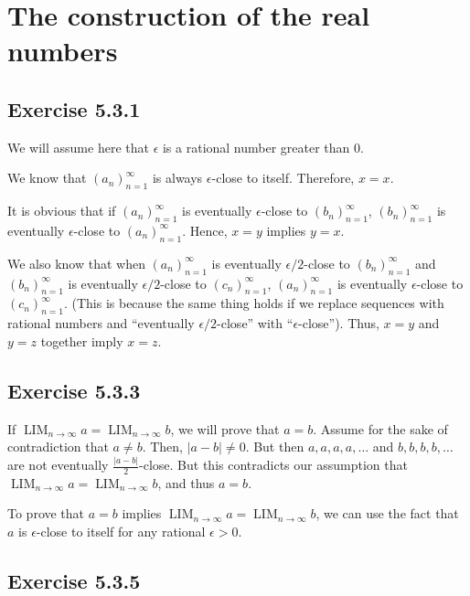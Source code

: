 \documentclass[12pt, oneside]{book}
\DeclareMathOperator*{\formallim}{LIM}
\begin{document}
	\section{The construction of the real numbers}
	
	\subsection*{Exercise 5.3.1}
	
	We will assume here that $\epsilon$ is a rational number greater than $0$.
	
	We know that $(a_n)_{n = 1}^\infty$ is always $\epsilon$-close to itself. Therefore, $x = x$.
	
	It is obvious that if $(a_n)_{n = 1}^\infty$ is eventually $\epsilon$-close to $(b_n)_{n = 1}^\infty$, $(b_n)_{n = 1}^\infty$ is eventually $\epsilon$-close to $(a_n)_{n = 1}^\infty$. Hence, $x = y$ implies $y = x$.
	
	We also know that when $(a_n)_{n = 1}^\infty$ is eventually $\epsilon/2$-close to $(b_n)_{n = 1}^\infty$ and $(b_n)_{n = 1}^\infty$ is eventually $\epsilon/2$-close to $(c_n)_{n = 1}^\infty$, $(a_n)_{n = 1}^\infty$ is eventually $\epsilon$-close to $(c_n)_{n = 1}^\infty$. (This is because the same thing holds if we replace sequences with rational numbers and ``eventually $\epsilon/2$-close'' with ``$\epsilon$-close''). Thus, $x = y$ and $y = z$ together imply $x = z$.
	
	\subsection*{Exercise 5.3.3}
	
	If $\formallim_{n \to \infty} a = \formallim_{n \to \infty} b$, we will prove that $a = b$. Assume for the sake of contradiction that $a \ne b$. Then, $|a - b| \ne 0$. But then $a, a, a, a, \dotsc$ and $b, b, b, b, \dotsc$ are not eventually $\frac{|a - b|}{2}$-close. But this contradicts our assumption that $\formallim_{n \to \infty} a = \formallim_{n \to \infty} b$, and thus $a = b$.
	
	To prove that $a = b$ implies $\formallim_{n \to \infty} a = \formallim_{n \to \infty} b$, we can use the fact that $a$ is $\epsilon$-close to itself for any rational $\epsilon > 0$.
	
	\subsection*{Exercise 5.3.5}
	
\end{document}
